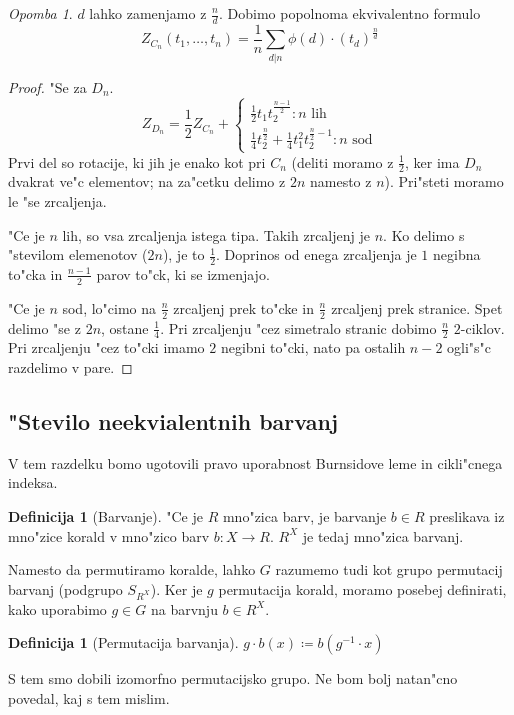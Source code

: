 \documentclass[a4paper,12pt]{article}
\theoremstyle{definition}
\newtheorem{defn}[counter]{Definicija}
\theoremstyle{remark}
\newtheorem*{rem}{Opomba}
\begin{document}
\begin{rem}
	$d$ lahko zamenjamo z $\frac{n}{d}$. Dobimo popolnoma ekvivalentno formulo
	\[Z_{C_n}(t_1, \ldots, t_n) = \frac{1}{n}\sum_{d|n}\phi(d) \cdot (t_d)^\frac{n}{d}\]
\end{rem}
\begin{proof}"Se za $D_n$.
	\[
	Z_{D_n} = \frac{1}{2}Z_{C_n} +
	\begin{cases}
		\frac{1}{2} t_1 t_2^{\frac{n-1}{2}}: n \text{ lih}
		\\
		\frac{1}{4} t_2^{\frac{n}{2}} + \frac{1}{4} t_1^2 t_2^{\frac{n}{2}-1}: n \text{ sod}
	\end{cases}
	\]
	Prvi del so rotacije, ki jih je enako kot pri $C_n$ (deliti moramo z $\frac{1}{2}$, ker ima $D_n$ dvakrat ve"c elementov; na za"cetku delimo z $2n$ namesto z $n$). Pri"steti moramo le "se zrcaljenja. 
	
	"Ce je $n$ lih, so vsa zrcaljenja istega tipa. Takih zrcaljenj je $n$. Ko delimo s "stevilom elemenotov ($2n$), je to $\frac{1}{2}$. Doprinos od enega zrcaljenja je $1$ negibna to"cka in $\frac{n-1}{2}$ parov to"ck, ki se izmenjajo.
	
	"Ce je $n$ sod, lo"cimo na $\frac{n}{2}$ zrcaljenj prek to"cke in $\frac{n}{2}$ zrcaljenj prek stranice. Spet delimo "se z $2n$, ostane $\frac{1}{4}$. Pri zrcaljenju "cez simetralo stranic dobimo $\frac{n}{2}$ $2$-ciklov. Pri zrcaljenju "cez to"cki imamo $2$ negibni to"cki, nato pa ostalih $n-2$ ogli"s"c razdelimo v pare.
\end{proof}


\subsection{"Stevilo neekvialentnih barvanj}
V tem razdelku bomo ugotovili pravo uporabnost Burnsidove leme in cikli"cnega indeksa.
\begin{defn}[Barvanje]
	"Ce je $R$ mno"zica barv, je barvanje $b \in R$ preslikava iz mno"zice korald v mno"zico barv
	$b : X \to R$.
	$R^X$ je tedaj mno"zica barvanj.
\end{defn}

Namesto da permutiramo koralde, lahko $G$ razumemo tudi kot grupo permutacij barvanj (podgrupo $S_{R^X}$). Ker je $g$ permutacija korald, moramo posebej definirati, kako uporabimo $g \in G$ na barvnju $b \in R^X$.
\begin{defn}[Permutacija barvanja]
	$g \cdot b(x) \coloneqq b (g^{-1} \cdot x)$
\end{defn}
S tem smo dobili izomorfno permutacijsko grupo. Ne bom bolj natan"cno povedal, kaj s tem mislim.
\end{document}
